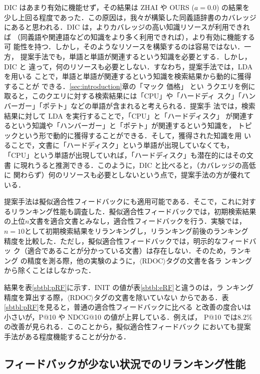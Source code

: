 \documentclass[japanese]{jnlp_1.4}
\begin{document}
DIC はあまり有効に機能せず，その結果は ZHAI や OURS ($a = 0.0$) の結果を
少し上回る程度であった．この原因は，我々が構築した同義語辞書のカバレッジ
にあると思われる．DIC は，よりカバレッジの高い知識リソースが利用できれば
（同義語や関連語などの知識をより多く利用できれば），より有効に機能する可
能性を持つ．しかし，そのようなリソースを構築するのは容易ではない．一方，
提案手法でも，単語と単語が関連するという知識を必要とする．しかし，DIC と
違って，何のリソースも必要としない．すなわち，提案手法では，LDA を用いる
ことで，単語と単語が関連するという知識を検索結果から動的に獲得することが
できる．\ref{sec:introduction}章の「マック{\textvisiblespace} 価格」 とい
うクエリを例に取ると，このクエリに対する検索結果には「CPU」や「ハードディ
スク」「ハンバーガー」「ポテト」などの単語が含まれると考えられる．提案手
法では，検索結果に対して LDA を実行することで，「CPU」と「ハードディスク」
が関連するという知識や「ハンバーガー」と「ポテト」が関連するという知識を，
トピックという形で動的に獲得することができる．そして，獲得された知識を用
いることで，文書に「ハードディスク」という単語が出現していなくても，
「CPU」という単語が出現していれば，「ハードディスク」も潜在的にはその文書
に現れうると推測できる．このように，DIC と比べると，（カバレッジの高低に
関わらず）何のリソースも必要としないという点で，提案手法の方が優れている．

提案手法は擬似適合性フィードバックにも適用可能である．そこで，これに対す
るリランキング性能も調査した．擬似適合性フィードバックでは，初期検索結果
の上位$n$文書を適合文書とみなし，適合性フィードバックを行う．実験では，
$n = 10$として初期検索結果をリランキングし，リランキング前後のランキング
精度を比較した．ただし，擬似適合性フィードバックでは，明示的なフィードバッ
ク（適合であることが分かっている文書）は存在しない．そのため，ランキング
の精度を測る際，他の実験のように，$\langle$RDOC$\rangle$タグの文書を各ラ
ンキングから除くことはしなかった．

結果を表\ref{sbtbl:pRF}に示す．INIT の値が表\ref{sbtbl:eRF}と違うのは，ラ
ンキング精度を算出する際，$\langle$RDOC$\rangle$タグの文書を除いていない
からである．表\ref{sbtbl:pRF}を見ると，普通の適合性フィードバックに比べる
と改善の度合いは小さいが，P@10 や NDCG@10 の値が上昇している．例えば，
P@10 では$8.2\%$の改善が見られる．このことから，擬似適合性フィードバック
においても提案手法がある程度機能することが分かる．


\subsection{フィードバックが少ない状況でのリランキング性能}
\label{ssec:experiment2}
\end{document}
